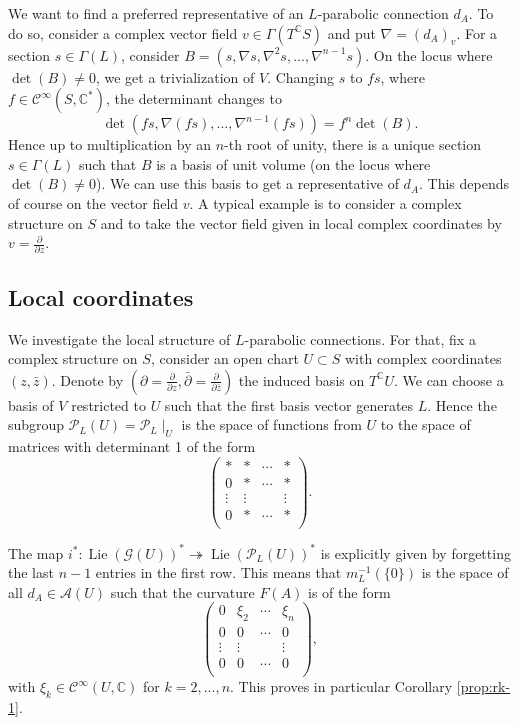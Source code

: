 \documentclass[11pt]{amsart}
\numberwithin{thm}{section} %
\numberwithin{equation}{section} %
\numberwithin{figure}{section} %
\newcommand*{\C}{\mathbb{C}}
\renewcommand*{\S}{S}
\DeclareMathOperator{\Lie}{Lie}
\begin{document}
We want to find a preferred representative of an $L$-parabolic connection $d_A$. To do so, consider a complex vector field $v\in \Gamma(T^{\C}\S)$ and put $\nabla=(d_A)_v$. For a section $s\in\Gamma(L)$, consider $B=(s,\nabla s, \nabla^2s,...,\nabla^{n-1}s)$. On the locus where $\det(B)\neq 0$, we get a trivialization of $V$. Changing $s$ to $fs$, where $f\in\mathcal{C}^{\infty}(\S,\C^*)$, the determinant changes to 
$$\det(fs,\nabla(fs),...,\nabla^{n-1}(fs))=f^{n}\det(B).$$
Hence up to multiplication by an $n$-th root of unity, there is a unique  section $s\in \Gamma(L)$ such that $B$ is a basis of unit volume (on the locus where $\det(B)\neq 0$).
We can use this basis to get a representative of $d_A$. This depends of course on the vector field $v$. A typical example is to consider a complex structure on $\S$ and to take the vector field given in local complex coordinates by $v=\tfrac{\partial}{\partial z}$.



\subsection{Local coordinates}\label{Sec:local-para-conn}

We investigate the local structure of $L$-parabolic connections. For that, fix a complex structure on $S$, consider an open chart $U\subset S$ with complex coordinates $(z,\bar{z})$. Denote by $(\partial=\tfrac{\partial}{\partial z}, \bar{\partial}=\tfrac{\partial}{\partial \bar{z}})$ the induced basis on $T^\C U$. We can choose a basis of $V$ restricted to $U$ such that the first basis vector generates $L$. Hence the subgroup $\mathcal{P}_L(U)=\mathcal{P}_L\!\mid_U$ is the space of functions from $U$ to the space of matrices with determinant 1 of the form 
\begin{equation}\label{Eq:form-P}
\begin{pmatrix}
* & * & \cdots & * \\
0 & * & \cdots & * \\
\vdots & \vdots & & \vdots \\
0 & *& \cdots & * \\
\end{pmatrix}.
\end{equation}

The map $i^*:\Lie(\mathcal{G}(U))^* \twoheadrightarrow \Lie(\mathcal{P}_L(U))^*$ is explicitly given by forgetting the last $n-1$ entries in the first row. This means that $m_L^{-1}(\{0\})$ is the space of all $d_A \in \mathcal{A}(U)$ such that the curvature $F(A)$ is of the form 
\begin{equation}\label{Eq:parab-curvature}
\begin{pmatrix}
 0& \xi_2 & \cdots & \xi_n\\
 0 & 0 & \cdots &0\\
 \vdots & \vdots &  & \vdots\\
 0& 0 &\cdots & 0 \\
\end{pmatrix},
\end{equation}
with $\xi_k\in\mathcal{C}^\infty(U,\C)$ for $k=2,...,n$. This proves in particular Corollary \ref{prop:rk-1}.
\end{document}
